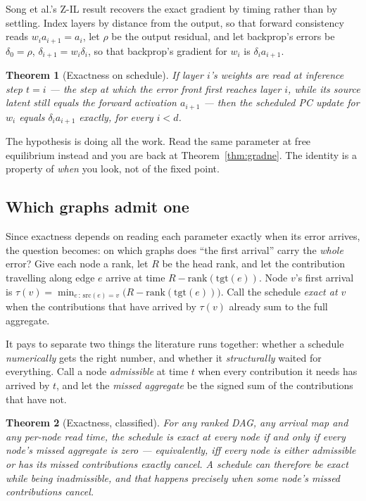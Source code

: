 \documentclass[11pt]{article}
\newtheorem{theorem}{Theorem}[section]
\begin{document}
Song et al.'s Z-IL result \cite{song2020} recovers the exact gradient by timing rather
than by settling. Index layers by distance from the output, so that forward consistency
reads $w_i a_{i+1} = a_i$, let $\rho$ be the output residual, and let backprop's errors
be $\delta_0 = \rho$, $\delta_{i+1} = w_i \delta_i$, so that backprop's gradient for
$w_i$ is $\delta_i a_{i+1}$.

\begin{theorem}[Exactness on schedule]\label{thm:zil}
If layer $i$'s weights are read at inference step $t = i$ --- the step at which the error
front first reaches layer $i$, while its source latent still equals the forward
activation $a_{i+1}$ --- then the scheduled PC update for $w_i$ equals $\delta_i a_{i+1}$
exactly, for every $i < d$.
\end{theorem}

The hypothesis is doing all the work. Read the same parameter at free equilibrium
instead and you are back at Theorem~\ref{thm:gradne}. The identity is a property of
\emph{when} you look, not of the fixed point.

\subsection{Which graphs admit one}

Since exactness depends on reading each parameter exactly when its error arrives, the
question becomes: on which graphs does ``the first arrival'' carry the \emph{whole}
error? Give each node a rank, let $R$ be the head rank, and let the contribution
travelling along edge $e$ arrive at time $R - \mathrm{rank}(\mathrm{tgt}(e))$. Node $v$'s
first arrival is $\tau(v) = \min_{e\,:\,\mathrm{src}(e)=v}\bigl(R -
\mathrm{rank}(\mathrm{tgt}(e))\bigr)$. Call the schedule \emph{exact at $v$} when the
contributions that have arrived by $\tau(v)$ already sum to the full aggregate.

It pays to separate two things the literature runs together: whether a schedule
\emph{numerically} gets the right number, and whether it \emph{structurally} waited for
everything. Call a node \emph{admissible} at time $t$ when every contribution it needs
has arrived by $t$, and let the \emph{missed aggregate} be the signed sum of the
contributions that have not.

\begin{theorem}[Exactness, classified]\label{thm:signed}
For any ranked DAG, any arrival map and any per-node read time, the schedule is exact at
every node if and only if every node's missed aggregate is zero --- equivalently, iff
every node is either admissible or has its missed contributions exactly cancel. A
schedule can therefore be exact while being inadmissible, and that happens precisely
when some node's missed contributions cancel.
\end{theorem}
\end{document}
